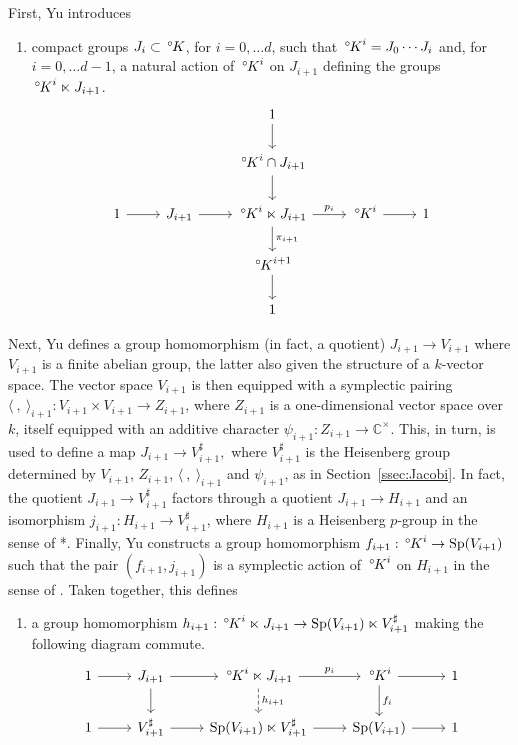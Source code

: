 \documentclass[10pt]{amsart}
\makeatletter
\theoremstyle{plain}
\theoremstyle{definition}
\newcommand{\CC}{{\mathbb{C}}}
\newcommand{\Fq}{k}
\newcommand{\labitem}[2]{
\def\@itemlabel{\textbf{#1}}
\item
\def\@currentlabel{#1}\label{#2}}
\newcommand{\Sp}{{\operatorname{Sp}}}
\newcommand{\oK}{{\,^\circ \hskip-1pt K}}
\makeatother
\begin{document}
First, Yu introduces 
\begin{enumerate}
\labitem{Y3}{Y3}
compact groups $J_i\subset \oK$, for $i=0, \ldots d$, such that 
$
\oK^i = J_0\cdots J_{i}
$ 
and, for $i=0, \ldots d-1$, a natural action of $\oK^i$ on $J_{i+1}$ defining the groups $\oK^i \ltimes J_{i+1}$.
\begin{equation}\label{eq:semiprod}
\begin{tikzcd}
\ && 1 \arrow{d} && \\
\ && \oK^{i}\cap J_{i+1}\arrow{d} && \\
1 \arrow{r} & J_{i+1} \arrow{r} & \oK^i \ltimes J_{i+1} \arrow{d}{\pi_{i+1}} \arrow{r}{p_i} & \oK^i \arrow{r} & 1\\
&& \oK^{i+1} \arrow{d}{} && \\
&& 1 &&
\end{tikzcd}
\end{equation}
\end{enumerate}
%
Next, Yu defines a group homomorphism (in fact, a quotient) 
$
J_{i+1} \to V_{i+1}
$
where $V_{i+1}$ is a finite abelian group, the latter also given the structure of a $\Fq$-vector space.
The vector space $V_{i+1}$ is then equipped with a symplectic pairing $\langle\ ,\ \rangle_{i+1} : V_{i+1}\times V_{i+1} \to Z_{i+1}$, where $Z_{i+1}$ is a one-dimensional vector space over $\Fq$, itself equipped with an additive character $\psi_{i+1} : Z_{i+1} \to \CC^\times$.
This, in turn, is used to define a map
$
J_{i+1} \to V_{i+1}^\sharp,
$
where $V_{i+1}^\sharp$ is the Heisenberg group determined by $V_{i+1}$, $Z_{i+1}$, $\langle\ ,\ \rangle_{i+1}$ and $\psi_{i+1}$, as in Section~\ref{ssec:Jacobi}.
In fact, the quotient $J_{i+1} \to V_{i+1}^\sharp$ factors through a quotient $J_{i+1} \to H_{i+1}$ and an isomorphism $j_{i+1} : H_{i+1} \to V_{i+1}^\sharp$, where $H_{i+1}$ is a Heisenberg $p$-group in the sense of \cite{yu:01a}*{}.
Finally, Yu constructs a group homomorphism $f_{i+1} : \oK^i \to \Sp(V_{i+1})$ such that the pair $(f_{i+1}, j_{i+1})$ is a symplectic action of $\oK^i$ on $H_{i+1}$ in the sense of \cite{yu:01a}.
%
Taken together, this defines
\begin{enumerate}
\labitem{Y4}{Y4}  
a group homomorphism $h_{i+1} : \oK^i \ltimes J_{i+1} \to  \Sp(V_{i+1})\ltimes V_{i+1}^\sharp$ making the following diagram commute.
\[
\begin{tikzcd}
1 \arrow{r} & J_{i+1} \arrow{d} \arrow{r} & \oK^i \ltimes J_{i+1} \arrow[dashed]{d}{h_{i+1}} \arrow{r}{p_i} & \oK^i \arrow{r} \arrow{d}{f_i} & 1\\ 
1 \arrow{r} & V_{i+1}^\sharp \arrow{r} & \Sp(V_{i+1}) \ltimes V_{i+1}^\sharp \arrow{r} & \Sp(V_{i+1}) \arrow{r} & 1
\end{tikzcd}
\]
\end{enumerate}
\end{document}
